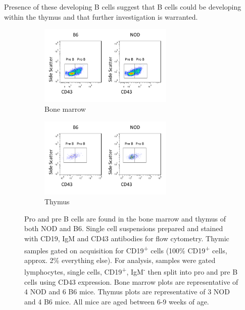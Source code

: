Presence of these developing B cells suggest that B cells could be developing within the thymus and that further investigation is warranted.


\begin{figure}
	\begin{subfigure}{\textwidth}
	\centering
	\includegraphics[width=0.7\textwidth]{Figures/Bonemarrowpropre.png}
	\caption{Bone marrow}
	\label{subfig:BMpropre}
	\end{subfigure}
	\begin{subfigure}{\textwidth}
	\centering
	\includegraphics[width=0.7\textwidth]{Figures/Thymuspropre.png}
	\caption{Thymus}
	\label{subfig:Thypropre}
	\end{subfigure}
\caption{Pro and pre B cells are found in the bone marrow and thymus of both NOD and B6. Single cell suspensions prepared and stained with CD19, IgM and CD43 antibodies for flow cytometry. Thymic samples gated on acquisition for CD19\textsuperscript{+} cells (100\% CD19\textsuperscript{+} cells, approx. 2\% everything else). For analysis, samples were gated lymphocytes, single cells, CD19\textsuperscript{+}, IgM\textsuperscript{-} then split into pro and pre B cells using CD43 expression. Bone marrow plots are representative of 4 NOD and 6 B6 mice. Thymus plots are representative of 3 NOD and 4 B6 mice. All mice are aged between 6-9 weeks of age.}
\label{fig:PropreBcells}
\end{figure}





